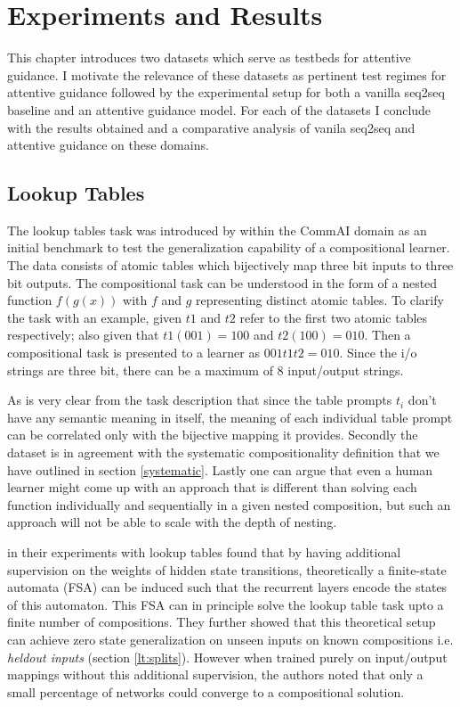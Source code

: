 \chapter{Experiments and Results}\label{Chapter:experiments}
This chapter introduces two datasets which serve as testbeds for attentive guidance. I motivate the relevance of these datasets as pertinent test regimes for attentive guidance followed by the experimental setup for both a vanilla seq2seq baseline and an attentive guidance model. For each of the datasets I conclude with the results obtained and a comparative analysis of vanila seq2seq and attentive guidance on these domains.

\section{Lookup Tables} \label{datasets:lt}

The lookup tables task was introduced by \cite{Liska2018} within the CommAI domain \citep{Baroni2017} as an initial benchmark to test the generalization capability of a compositional learner. The data consists of atomic tables which bijectively map three bit inputs to three bit outputs. The compositional task can be understood in the form of a nested function $f(g(x))$ with $f$ and $g$ representing distinct atomic tables. To clarify the task with an example, given $t1$ and $t2$ refer to the first two atomic tables respectively; also given that $t1(001) = 100$ and $t2(100) = 010$. Then a compositional task is presented to a learner as $001 t1 t2 = 010$. Since the i/o strings are three bit, there can be a maximum of 8 input/output strings.

As is very clear from the task description that since the table prompts $t_i$ don't have any semantic meaning in itself, the meaning of each individual table prompt can be correlated only with the bijective mapping it provides. Secondly the dataset is in agreement with the systematic compositionality definition that we have outlined in section \ref{systematic}. Lastly one can argue that even a human learner might come up with an approach that is different than solving each function individually and sequentially in a given nested composition, but such an approach will not be able to scale with the depth of nesting.

\cite{Liska2018} in their experiments with lookup tables found that by having additional supervision on the weights of hidden state transitions, theoretically a finite-state automata (FSA) can be induced such that the recurrent layers encode the states of this automaton. This FSA can in principle solve the lookup table task upto a finite number of compositions. They further showed that this theoretical setup can achieve zero state generalization on unseen inputs on known compositions i.e. \textit{heldout inputs} (section \ref{lt:splits}). However when trained purely on input/output mappings without this additional supervision, the authors noted that only a small percentage of networks could converge to a compositional solution.

